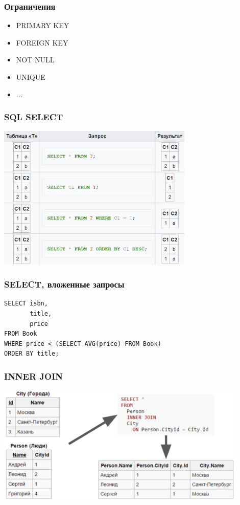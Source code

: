\documentclass{../../slides-style}
\begin{document}
    \begin{frame}
        \frametitle{Ограничения}
        \begin{itemize}
            \item PRIMARY KEY
            \item FOREIGN KEY
            \item NOT NULL
            \item UNIQUE
            \item ...
        \end{itemize}
    \end{frame}

    \begin{frame}
        \frametitle{SQL SELECT}
        \begin{center}
            \includegraphics[width=0.7\textwidth]{select.png}
        \end{center}
    \end{frame}

    \begin{frame}[fragile]
        \frametitle{SELECT, вложенные запросы}
        \begin{verbatim}
SELECT isbn,
       title,
       price
FROM Book
WHERE price < (SELECT AVG(price) FROM Book)
ORDER BY title;
        \end{verbatim}
    \end{frame}

    \begin{frame}
        \frametitle{INNER JOIN}
        \begin{center}
            \includegraphics[width=0.9\textwidth]{innerJoin.png}
        \end{center}
    \end{frame}
\end{document}
